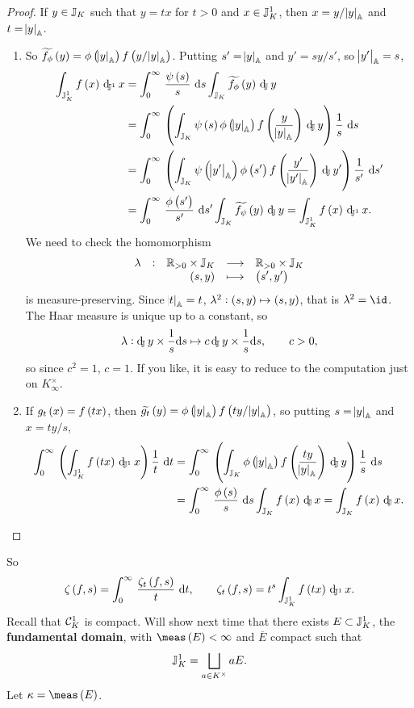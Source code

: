 \begin{proof}
If $ y \in \mathbb{J}_K $ such that $ y = tx $ for $ t > 0 $ and $ x \in \mathbb{J}_K^1 $, then $ x = y / \abs{y}_{\mathbb{A}} $ and $ t = \abs{y}_{\mathbb{A}} $.
\begin{enumerate}
\item So $ \widetilde{f_\phi}\br{y} = \phi\br{\abs{y}_\AA}f\br{y / \abs{y}_\AA} $. Putting $ s' = \abs{y}_{\mathbb{A}} $ and $ y' = sy / s' $, so $ \abs{y'}_{\mathbb{A}} = s $,
\begin{align*}
\intJI{f\br{x}}{x}
& = \intd{0}{\infty}{\dfrac{\psi\br{s}}{s}}{s}\intJ{\widetilde{f_\phi}\br{y}}{y} \\
& = \intd{0}{\infty}{\br{\intJ{\psi\br{s}\phi\br{\abs{y}_\AA}f\br{\dfrac{y}{\abs{y}_\AA}}}{y}}\dfrac{1}{s}}{s} \\
& = \intd{0}{\infty}{\br{\intJ{\psi\br{\abs{y'}_\AA}\phi\br{s'}f\br{\dfrac{y'}{\abs{y'}_\AA}}}{y'}}\dfrac{1}{s'}}{s'} \\
& = \intd{0}{\infty}{\dfrac{\phi\br{s'}}{s'}}{s'}\intJ{\widetilde{f_\psi}\br{y}}{y}
= \intJI{f\br{x}}{x}.
\end{align*}
We need to check the homomorphism
$$ \function[\lambda]{\RR_{> 0} \times \JJ_K}{\RR_{> 0} \times \JJ_K}{\br{s, y}}{\br{s', y'}} $$
is measure-preserving. Since $ \abs{t}_{\mathbb{A}} = t $, $ \lambda^2 : \br{s, y} \mapsto \br{s, y} $, that is $ \lambda^2 = \id $. The Haar measure is unique up to a constant, so
$$ \lambda : \dJ y \times \dfrac{1}{s}\d s \mapsto c\dJ y \times \dfrac{1}{s}\d s, \qquad c > 0, $$
so since $ c^2 = 1 $, $ c = 1 $. If you like, it is easy to reduce to the computation just on $ K_\infty^\times $.
\item If $ g_t\br{x} = f\br{tx} $, then $ \widetilde{g_t}\br{y} = \phi\br{\abs{y}_\AA}f\br{ty / \abs{y}_\AA} $, so putting $ s = \abs{y}_{\mathbb{A}} $ and $ x = ty / s $,
\begin{align*}
\intd{0}{\infty}{\br{\intJI{f\br{tx}}{x}}\dfrac{1}{t}}{t}
& = \intd{0}{\infty}{\br{\intJ{\phi\br{\abs{y}_\AA}f\br{\dfrac{ty}{\abs{y}_\AA}}}{y}}\dfrac{1}{s}}{s} \\
& = \intd{0}{\infty}{\dfrac{\phi\br{s}}{s}}{s}\intJ{f\br{x}}{x}
= \intJ{f\br{x}}{x}.
\end{align*}
\end{enumerate}
\end{proof}

So
$$ \zeta\br{f, s} = \intd{0}{\infty}{\dfrac{\zeta_t\br{f, s}}{t}}{t}, \qquad \zeta_t\br{f, s} = t^s\intJI{f\br{tx}}{x}. $$
Recall that $ \mathcal{C}_K^1 $ is compact. Will show next time that there exists $ E \subset \mathbb{J}_K^1 $, the \textbf{fundamental domain}, with $ \meas\br{E} < \infty $ and $ \overline{E} $ compact such that
$$ \mathbb{J}_K^1 = \bigsqcup_{a \in K^\times} aE. $$
Let $ \kappa = \meas\br{E} $.

